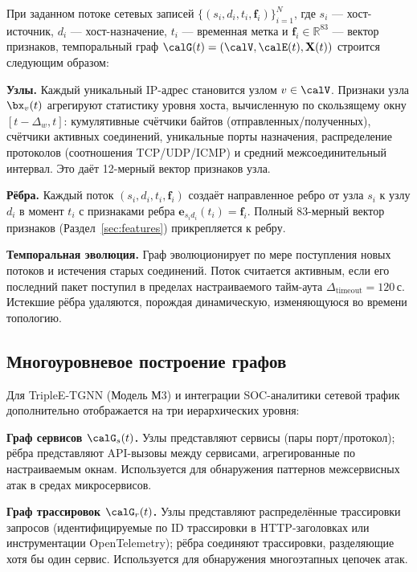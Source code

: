 При заданном потоке сетевых записей $\{(s_i, d_i, t_i, \mathbf{f}_i)\}_{i=1}^{N}$, где $s_i$ --- хост-источник, $d_i$ --- хост-назначение, $t_i$ --- временная метка и $\mathbf{f}_i\in\mathbb{R}^{83}$ --- вектор признаков, темпоральный граф $\calG(t)=(\calV,\calE(t),\mathbf{X}(t))$ строится следующим образом:

\noindent\textbf{Узлы.} Каждый уникальный IP-адрес становится узлом $v\in\calV$. Признаки узла $\bx_v(t)$ агрегируют статистику уровня хоста, вычисленную по скользящему окну $[t-\Delta_w, t]$: кумулятивные счётчики байтов (отправленных/полученных), счётчики активных соединений, уникальные порты назначения, распределение протоколов (соотношения TCP/UDP/ICMP) и средний межсоединительный интервал. Это даёт 12-мерный вектор признаков узла.

\noindent\textbf{Рёбра.} Каждый поток $(s_i, d_i, t_i, \mathbf{f}_i)$ создаёт направленное ребро от узла $s_i$ к узлу $d_i$ в момент $t_i$ с признаками ребра $\mathbf{e}_{s_id_i}(t_i) = \mathbf{f}_i$. Полный 83-мерный вектор признаков (Раздел~\ref{sec:features}) прикрепляется к ребру.

\noindent\textbf{Темпоральная эволюция.} Граф эволюционирует по мере поступления новых потоков и истечения старых соединений. Поток считается активным, если его последний пакет поступил в пределах настраиваемого тайм-аута $\Delta_{\mathrm{timeout}}=120$\,с. Истекшие рёбра удаляются, порождая динамическую, изменяющуюся во времени топологию.

\subsection{Многоуровневое построение графов}

Для TripleE-TGNN (Модель М3) и интеграции SOC-аналитики сетевой трафик дополнительно отображается на три иерархических уровня:

\noindent\textbf{Граф сервисов $\calG_s(t)$.} Узлы представляют сервисы (пары порт/протокол); рёбра представляют API-вызовы между сервисами, агрегированные по настраиваемым окнам. Используется для обнаружения паттернов межсервисных атак в средах микросервисов.

\noindent\textbf{Граф трассировок $\calG_r(t)$.} Узлы представляют распределённые трассировки запросов (идентифицируемые по ID трассировки в HTTP-заголовках или инструментации OpenTelemetry); рёбра соединяют трассировки, разделяющие хотя бы один сервис. Используется для обнаружения многоэтапных цепочек атак.

